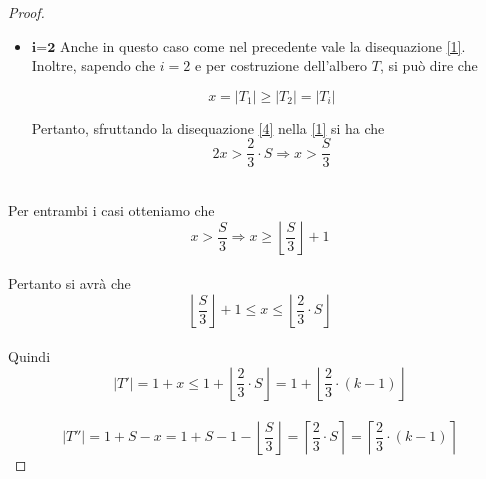 \begin{proof}
\begin{itemize}
	\begin{equation}\label{2}
	|T_i| \le \frac{S}{i} \le \frac{S}{3}	
	\end{equation}
\\
		
	Sottraendo la disequazione \eqref{2} alla \eqref{1} si ottiene che 
	\\
	\begin{equation}\label{3}
	x > \frac{2}{3}\cdot S - \frac{S}{3} = \frac{S}{3}	
	\end{equation}
\\
 	\item $ \textbf{i=2} $ Anche in questo caso come nel precedente vale la disequazione \eqref{1}.\\
 	Inoltre, sapendo che $ i = 2 $ e per costruzione dell'albero $ T $, si pu\`o dire che
 	
 	\begin{equation}\label{4}
 	x = |T_1| \ge |T_2| = |T_i|
 	\end{equation}
 	
 	Pertanto, sfruttando la disequazione \ref{4} nella \ref{1} si ha che
 	\begin{equation}\label{5}
 	2x > \frac{2}{3} \cdot S \Rightarrow x > \frac{S}{3}
 	\end{equation}
	\end{itemize}\mbox{}\\


Per entrambi i casi otteniamo che 
\\
\[ x > \frac{S}{3} \Rightarrow x \ge \left\lfloor \frac{S}{3}\right\rfloor  + 1 \]
\\

Pertanto si avr\`a che 
\\
\[ \left\lfloor \frac{S}{3}\right\rfloor  + 1 \le x \le \left\lfloor \frac{2}{3}\cdot S \right\rfloor \] 
\\

Quindi 
\\
\begin{equation}\label{5}
|T'| = 1+x \le 1 + \left\lfloor \frac{2}{3}\cdot S \right\rfloor = 1 + \left\lfloor \frac{2}{3} \cdot (k-1) \right\rfloor	
\end{equation}
\\
\begin{equation}\label{6}
|T''| = 1 + S - x = 1+S-1 - \left\lfloor \frac{S}{3}\right\rfloor = \left\lceil \frac{2}{3}\cdot S \right\rceil = \left\lceil \frac{2}{3} \cdot (k-1) \right\rceil 	
\end{equation}


\end{proof}
